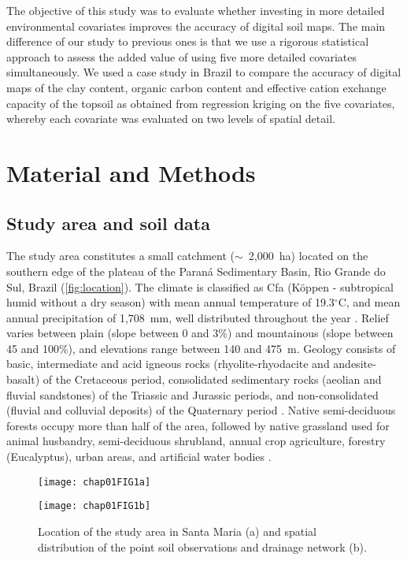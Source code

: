 The objective of this study was to evaluate whether investing in more detailed 
environmental covariates improves the accuracy of digital soil maps. The main 
difference of our study to previous ones is that we use a rigorous statistical 
approach to assess the added value of using five more detailed covariates 
simultaneously. We used a case study in Brazil to compare the accuracy of 
digital maps of the clay content, organic carbon content and effective cation 
exchange capacity of the topsoil as obtained from regression kriging on the 
five covariates, whereby each covariate was evaluated on two levels of spatial 
detail.

\section{Material and Methods}
\label{sec:methods}

\subsection{Study area and soil data}
\label{subsec:soil-data}

The study area constitutes a small catchment ($\sim$~2,000~ha) located on the 
southern edge of the plateau of the Paraná Sedimentary Basin, Rio Grande do Sul,
Brazil (\autoref{fig:location}). The climate is classified as Cfa (K\"oppen - 
subtropical humid without a dry season) with mean annual temperature of 
19.3$^{\circ}$C, and mean annual precipitation of 1,708~mm, well distributed 
throughout the year \citep{Maluf2000}. Relief varies between plain (slope 
between 0 and 3\%) and mountainous (slope between 45 and 100\%), and elevations 
range between 140 and 475~m. Geology consists of basic, intermediate and acid 
igneous rocks (rhyolite-rhyodacite and andesite-basalt) of the Cretaceous period,
consolidated sedimentary rocks (aeolian and fluvial sandstones) of the Triassic 
and Jurassic periods, and non-consolidated (fluvial and colluvial deposits) of 
the Quaternary period \citep{GasparettoEtAl1988, MacielFilho1990, Sartori2009}. 
Native semi-deciduous forests occupy more than half of the area, followed by 
native grassland used for animal husbandry, semi-deciduous shrubland, annual 
crop agriculture, forestry (Eucalyptus), urban areas, and artificial water 
bodies \citep{SamuelRosaEtAl2011a}.

 \begin{figure}[!ht]
    \centering
    \begin{minipage}[b]{95mm}
      \subcaption{}
      \label{fig:brazil}
      \centering
      \texttt{[image: chap01FIG1a]}
    \end{minipage}
    \begin{minipage}[b]{95mm}
      \subcaption{}
      \label{fig:points}
      \centering
      \texttt{[image: chap01FIG1b]}
    \end{minipage}
  \caption{Location of the study area in Santa Maria (a) and spatial 
  distribution of the point soil observations and drainage network (b).}
  \label{fig:location}
 \end{figure}

